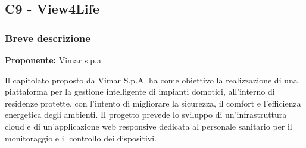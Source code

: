 \documentclass[a4paper,11pt]{article}
\begin{document}
\newpage
\subsection{C9 - View4Life}
\subsubsection{Breve descrizione}
\textbf{Proponente:} Vimar s.p.a
\vspace{0.5em}\\
\parbox[t]{\linewidth}{%
Il capitolato proposto da Vimar S.p.A. ha come obiettivo la realizzazione di una piattaforma per la gestione intelligente di impianti domotici, all'interno di residenze protette, con l'intento di migliorare la sicurezza, il comfort e l'efficienza energetica degli ambienti. Il progetto prevede lo sviluppo di un'infrastruttura cloud e di un'applicazione web responsive dedicata al personale sanitario per il monitoraggio e il controllo dei dispositivi.
}
\end{document}
